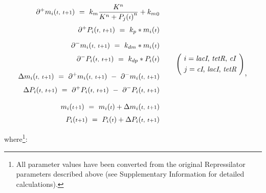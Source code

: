 \documentclass[runningheads,a4paper]{llncs}
\begin{document}
\begin{equation*}
    \begin{aligned}
        \partial^{+}m_{i}({\scriptstyle t,\ t+1})\ =\ k_{m}\frac{K^{n}}{K^{n}+{P_{j}({\scriptstyle t})}^{n}}+{k_{m}}_{0} \\[0.1cm]
        \partial^{+}P_{i}({\scriptstyle t,\ t+1})\ =\ k_{p}*{m_{i}({\scriptstyle t})} \\[0.2cm]
        \partial^{-}m_{i}({\scriptstyle t,\ t+1})\ =\ k_{dm}*{m_{i}({\scriptstyle t})} \\[0.1cm]
        \partial^{-}P_{i}({\scriptstyle t,\ t+1})\ =\ k_{dp}*{P_{i}({\scriptstyle t})} \\[0.3cm]
        \Delta m_{i}({\scriptstyle t,\ t+1})\ =\ \partial^{+}m_{i}({\scriptstyle t,\ t+1})\ -\ \partial^{-}m_{i}({\scriptstyle t,\ t+1}) \\[0.1cm]
        \Delta P_{i}({\scriptstyle t,\ t+1})\ =\ \partial^{+}P_{i}({\scriptstyle t,\ t+1})\ -\ \partial^{-}P_{i}({\scriptstyle t,\ t+1}) \\[0.3cm]
        m_{i}({\scriptstyle t+1})\ =\ m_{i}({\scriptstyle t}) + \Delta m_{i}({\scriptstyle t,\ t+1}) \\[0.1cm]
        P_{i}({\scriptstyle t+1})\ =\ P_{i}({\scriptstyle t}) + \Delta P_{i}({\scriptstyle t,\ t+1})
    \end{aligned}
    \hspace{0.8cm}
    \Bigg(\ 
        \begin{aligned}
            i = \textrm{\textit{lacI}, \textit{tetR}, \textit{cI}}    \\
            j = \textrm{\textit{cI}, \textit{lacI}, \textit{tetR}}
        \end{aligned}\ 
    \Bigg)_\textrm{\large{,}}
\end{equation*}
    
\noindent where\footnote{All parameter values have been converted from the original Repressilator parameters described above (see Supplementary Information for detailed calculations).}:
\end{document}
